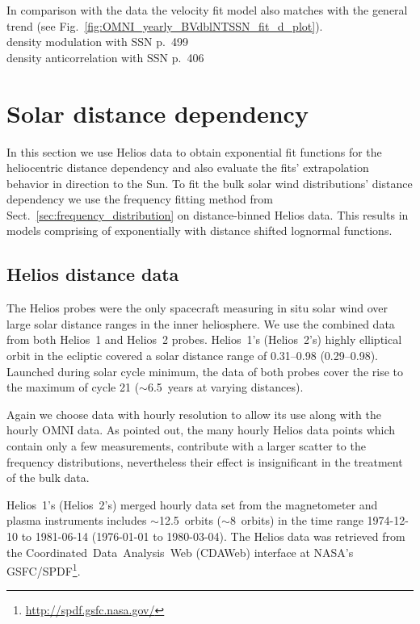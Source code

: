 In comparison with the data the velocity fit model also matches with the general trend (see Fig.~\ref{fig:OMNI_yearly_BVdblNTSSN_fit_d_plot}).\\

density modulation with SSN \citep{Schwenn1983} p.~499\\
density anticorrelation with SSN \citep{Bougeret1984} p.~406\\


\section{Solar distance dependency}
\label{sec:solar_distance_dependency}
In this section we use Helios data to obtain exponential fit functions for the heliocentric distance dependency and also evaluate the fits' extrapolation behavior in direction to the Sun. To fit the bulk solar wind distributions' distance dependency we use the frequency fitting method from Sect.~\ref{sec:frequency_distribution} on distance-binned Helios data. This results in models comprising of exponentially with distance shifted lognormal functions.

\subsection{Helios distance data}
\label{sec:helios_distance_data}
The Helios probes were the only spacecraft measuring in situ solar wind over large solar distance ranges in the inner heliosphere. We use the combined data from both Helios~1 and Helios~2 probes. Helios~1's (Helios~2's) highly elliptical orbit in the ecliptic covered a solar distance range of \SIrange{0.31}{0.98}{\au} (\SIrange{0.29}{0.98}{\au}). Launched during solar cycle minimum, the data of both probes cover the rise to the maximum of cycle 21 ($\sim$6.5~years at varying distances).

Again we choose data with hourly resolution to allow its use along with the hourly OMNI data. As \citet{Schwenn1983} pointed out, the many hourly Helios data points which contain only a few measurements, contribute with a larger scatter to the frequency distributions, nevertheless their effect is insignificant in the treatment of the bulk data.	%

Helios~1's (Helios~2's) merged hourly data set from the magnetometer and plasma instruments \citep{Rosenbauer1977} includes $\sim$12.5~orbits ($\sim$8~orbits) in the time range \mbox{1974-12-10} to \mbox{1981-06-14} (\mbox{1976-01-01} to \mbox{1980-03-04}).
The Helios data was retrieved from the Coordinated~Data~Analysis~Web (CDAWeb) interface at NASA's GSFC/SPDF\footnote{\url{http://spdf.gsfc.nasa.gov/}}.

